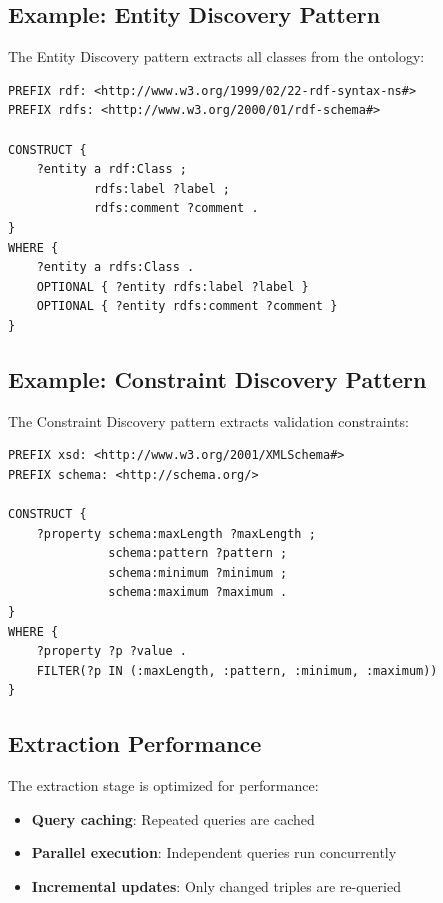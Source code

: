 \subsection{Example: Entity Discovery Pattern}

The Entity Discovery pattern extracts all classes from the ontology:

\begin{verbatim}
PREFIX rdf: <http://www.w3.org/1999/02/22-rdf-syntax-ns#>
PREFIX rdfs: <http://www.w3.org/2000/01/rdf-schema#>

CONSTRUCT {
    ?entity a rdf:Class ;
            rdfs:label ?label ;
            rdfs:comment ?comment .
}
WHERE {
    ?entity a rdfs:Class .
    OPTIONAL { ?entity rdfs:label ?label }
    OPTIONAL { ?entity rdfs:comment ?comment }
}
\end{verbatim}

\subsection{Example: Constraint Discovery Pattern}

The Constraint Discovery pattern extracts validation constraints:

\begin{verbatim}
PREFIX xsd: <http://www.w3.org/2001/XMLSchema#>
PREFIX schema: <http://schema.org/>

CONSTRUCT {
    ?property schema:maxLength ?maxLength ;
              schema:pattern ?pattern ;
              schema:minimum ?minimum ;
              schema:maximum ?maximum .
}
WHERE {
    ?property ?p ?value .
    FILTER(?p IN (:maxLength, :pattern, :minimum, :maximum))
}
\end{verbatim}

\subsection{Extraction Performance}

The extraction stage is optimized for performance:

\begin{itemize}
    \item \textbf{Query caching}: Repeated queries are cached
    \item \textbf{Parallel execution}: Independent queries run concurrently
    \item \textbf{Incremental updates}: Only changed triples are re-queried
\end{itemize}

